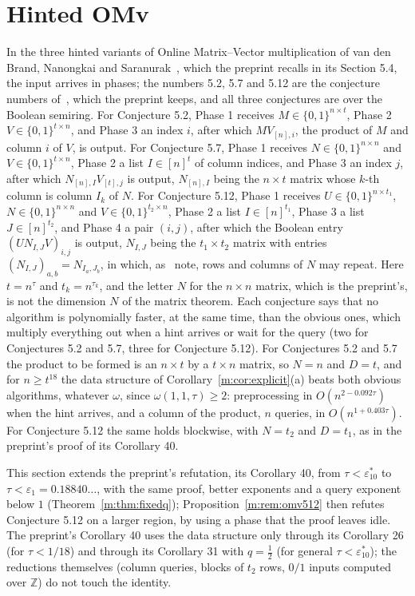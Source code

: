 \documentclass[11pt]{article}
\theoremstyle{definition}
\theoremstyle{remark}
\newcommand{\Z}{\mathbb{Z}}
\newcommand{\et}{\varepsilon^*_{10}}
\newcommand{\HintedOMvRfourteen}{0.18840}%
\begin{document}
\FloatBarrier
\section{Hinted OMv}\label{m:sec:omv}

In the three hinted variants of Online Matrix--Vector multiplication of van den Brand, Nanongkai and Saranurak~\cite{BNS19}, which the preprint recalls in its Section 5.4, the input arrives in phases; the numbers 5.2, 5.7 and 5.12 are the conjecture numbers of~\cite{BNS19}, which the preprint keeps, and all three conjectures are over the Boolean semiring. For Conjecture 5.2, Phase 1 receives $M\in\{0,1\}^{n\times t}$, Phase 2 $V\in\{0,1\}^{t\times n}$, and Phase 3 an index $i$, after which $MV_{[n],i}$, the product of $M$ and column $i$ of $V$, is output. For Conjecture 5.7, Phase 1 receives $N\in\{0,1\}^{n\times n}$ and $V\in\{0,1\}^{t\times n}$, Phase 2 a list $I\in[n]^t$ of column indices, and Phase 3 an index $j$, after which $N_{[n],I}V_{[t],j}$ is output, $N_{[n],I}$ being the $n\times t$ matrix whose $k$-th column is column $I_k$ of $N$. For Conjecture 5.12, Phase 1 receives $U\in\{0,1\}^{n\times t_1}$, $N\in\{0,1\}^{n\times n}$ and $V\in\{0,1\}^{t_2\times n}$, Phase 2 a list $I\in[n]^{t_1}$, Phase 3 a list $J\in[n]^{t_2}$, and Phase 4 a pair $(i,j)$, after which the Boolean entry $(UN_{I,J}V)_{i,j}$ is output, $N_{I,J}$ being the $t_1\times t_2$ matrix with entries $(N_{I,J})_{a,b}=N_{I_a,J_b}$, in which, as~\cite{BNS19} note, rows and columns of $N$ may repeat. Here $t=n^\tau$ and $t_k=n^{\tau_k}$, and the letter $N$ for the $n\times n$ matrix, which is the preprint's, is not the dimension $N$ of the matrix theorem. Each conjecture says that no algorithm is polynomially faster, at the same time, than the obvious ones, which multiply everything out when a hint arrives or wait for the query (two for Conjectures 5.2 and 5.7, three for Conjecture 5.12). For Conjectures 5.2 and 5.7 the product to be formed is an $n\times t$ by a $t\times n$ matrix, so $N=n$ and $D=t$, and for $n\ge t^{18}$ the data structure of Corollary~\ref{m:cor:explicit}(a) beats both obvious algorithms, whatever $\omega$, since $\omega(1,1,\tau)\ge2$: preprocessing in $O(n^{2-0.092\tau})$ when the hint arrives, and a column of the product, $n$ queries, in $O(n^{1+0.403\tau})$. For Conjecture 5.12 the same holds blockwise, with $N=t_2$ and $D=t_1$, as in the preprint's proof of its Corollary 40.

This section extends the preprint's refutation, its Corollary 40, from $\tau<\et$ to $\tau<\varepsilon_1=\HintedOMvRfourteen\ldots$, with the same proof, better exponents and a query exponent below $1$ (Theorem~\ref{m:thm:fixedq}); Proposition~\ref{m:rem:omv512} then refutes Conjecture 5.12 on a larger region, by using a phase that the proof leaves idle. The preprint's Corollary 40 uses the data structure only through its Corollary 26 (for $\tau<1/18$) and through its Corollary 31 with $q=\frac12$ (for general $\tau<\et$); the reductions themselves (column queries, blocks of $t_2$ rows, $0/1$ inputs computed over $\Z$) do not touch the identity.
\end{document}
